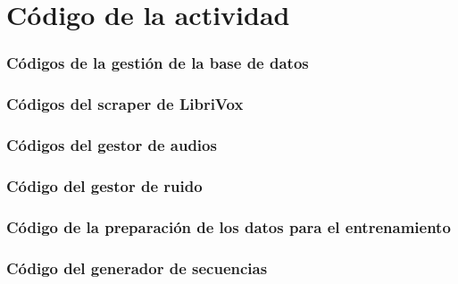 \chapter{Código de la actividad}

\subsection{Códigos de la gestión de la base de datos}


\subsection{Códigos del scraper de LibriVox}


\subsection{Códigos del gestor de audios}


\subsection{Código del gestor de ruido}


\subsection{Código de la preparación de los datos para el entrenamiento}


\subsection{Código del generador de secuencias}


